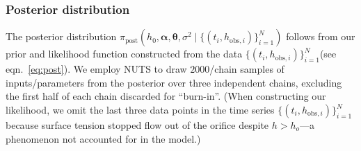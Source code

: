 \documentclass[a4paper,fleqn]{cas-dc}
\newcommand\thedata {$\{(t_i,h_{\text{obs}, i})\}_{i=1}^{N}$\xspace}
\newcommand\thedatanomath {\{(t_i,h_{\text{obs}, i})\}_{i=1}^{N}}
\begin{document}
\subsubsection{Posterior distribution}
The posterior distribution $\pi_{\text{post}}(h_0, \boldsymbol \alpha, \boldsymbol \theta, \sigma^2 \mid \thedatanomath)$ follows from our prior and likelihood function constructed from the data \thedata (see eqn.~\ref{eq:post}). 
We employ NUTS to draw $2000$/chain samples of inputs/parameters from the posterior over three independent chains, excluding the first half of each chain discarded for ``burn-in''. 
(When constructing our likelihood, we omit the last three data points in the time series \thedata because surface tension stopped flow out of the orifice despite $h>h_o$---a phenomenon not accounted for in the model.)
\end{document}
